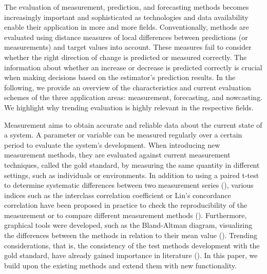 The evaluation of measurement, prediction, and forecasting methods becomes increasingly important and sophisticated as technologies and data availability enable their application in more and more fields. 
Conventionally, methods are evaluated using distance measures of local differences between predictions (or measurements) and target values into account. 
These measures fail to consider whether the right direction of change is predicted or measured correctly.
The information about whether an increase or decrease is predicted correctly is crucial when making decisions based on the estimator's prediction results. 
In the following, we provide an overview of the characteristics and current evaluation schemes of the three application areas: measurement, forecasting, and nowcasting.
We highlight why trending evaluation is highly relevant in the respective fields.

Measurement aims to obtain accurate and reliable data about the current state of a system. 
A parameter or variable can be measured regularly over a certain period to evaluate the system's development.
When introducing new measurement methods, they are evaluated against current measurement techniques, called the gold standard, by measuring the same quantity in different settings, such as individuals or environments.
In addition to using a paired t-test to determine systematic differences between two measurement series (\cite{watson2010method}), various indices such as the interclass correlation coefficient or Lin's concordance correlation have been proposed in practice to check the reproducibility of the measurement or to compare different measurement methods (\cite{lawrence1989concordance,koo2016guideline}). 
Furthermore, graphical tools were developed, such as the Bland-Altman diagram, visualizing the differences between the methods in relation to their mean value (\cite{bland1986statistical}). 
Trending considerations, that is, the consistency of the test methods development with the gold standard, have already gained importance in literature (\cite{Saugel2015,saugel2018error,hiraishi2021concordance}). 
In this paper, we build upon the existing methods and extend them with new functionality.


